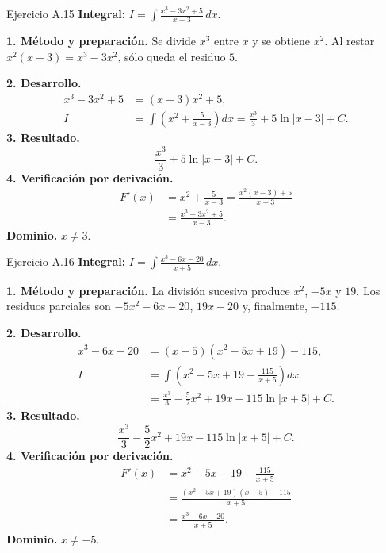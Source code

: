 \begin{examplebox}{Ejercicio A.15}
\textbf{Integral:} $\displaystyle I=\int \frac{x^3-3x^2+5}{x-3}\,dx$.

\textbf{1. Método y preparación.} Se divide $x^3$ entre $x$ y se obtiene $x^2$. Al restar $x^2(x-3)=x^3-3x^2$, sólo queda el residuo $5$.

\textbf{2. Desarrollo.}
\begin{align*}
x^3-3x^2+5&=(x-3)x^2+5,\\I&=\int\left(x^2+\frac5{x-3}\right)dx=\frac{x^3}{3}+5\ln|x-3|+C.
\end{align*}
\textbf{3. Resultado.}
\[
\frac{x^3}{3}+5\ln|x-3|+C.
\]
\textbf{4. Verificación por derivación.}
\begin{align*}
F'(x)&=x^2+\frac5{x-3}=\frac{x^2(x-3)+5}{x-3}\\&=\frac{x^3-3x^2+5}{x-3}.
\end{align*}
\textbf{Dominio.} $x\ne3$.
\end{examplebox}

\begin{examplebox}{Ejercicio A.16}
\textbf{Integral:} $\displaystyle I=\int \frac{x^3-6x-20}{x+5}\,dx$.

\textbf{1. Método y preparación.} La división sucesiva produce $x^2$, $-5x$ y $19$. Los residuos parciales son $-5x^2-6x-20$, $19x-20$ y, finalmente, $-115$.

\textbf{2. Desarrollo.}
\begin{align*}
x^3-6x-20&=(x+5)(x^2-5x+19)-115,\\I&=\int\left(x^2-5x+19-\frac{115}{x+5}\right)dx\\&=\frac{x^3}{3}-\frac52x^2+19x-115\ln|x+5|+C.
\end{align*}
\textbf{3. Resultado.}
\[
\frac{x^3}{3}-\frac52x^2+19x-115\ln|x+5|+C.
\]
\textbf{4. Verificación por derivación.}
\begin{align*}
F'(x)&=x^2-5x+19-\frac{115}{x+5}\\&=\frac{(x^2-5x+19)(x+5)-115}{x+5}\\&=\frac{x^3-6x-20}{x+5}.
\end{align*}
\textbf{Dominio.} $x\ne-5$.
\end{examplebox}

